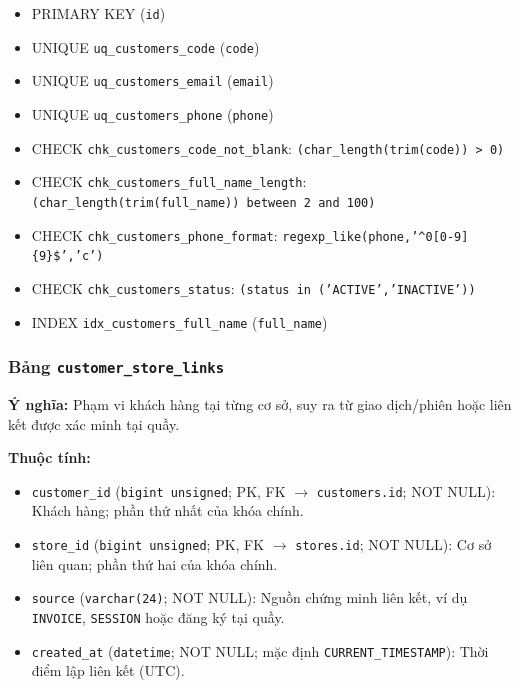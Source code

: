 \begin{itemize}

\item PRIMARY KEY (\texttt{id})

\item UNIQUE \texttt{uq\_customers\_code} (\texttt{code})

\item UNIQUE \texttt{uq\_customers\_email} (\texttt{email})

\item UNIQUE \texttt{uq\_customers\_phone} (\texttt{phone})

\item CHECK \texttt{chk\_customers\_code\_not\_blank}: \texttt{(char\_length(trim(code)) > 0)}

\item CHECK \texttt{chk\_customers\_full\_name\_length}: \texttt{(char\_length(trim(full\_name)) between 2 and 100)}

\item CHECK \texttt{chk\_customers\_phone\_format}: \texttt{regexp\_like(phone,'^0[0-9]\{9\}\$','c')}

\item CHECK \texttt{chk\_customers\_status}: \texttt{(status in ('ACTIVE','INACTIVE'))}

\item INDEX \texttt{idx\_customers\_full\_name} (\texttt{full\_name})

\end{itemize}

\subsubsection{Bảng \texttt{customer\_store\_links}}

\textbf{Ý nghĩa:} Phạm vi khách hàng tại từng cơ sở, suy ra từ giao dịch/phiên hoặc liên kết được xác minh tại quầy.\par

\textbf{Thuộc tính:}

\begin{itemize}

\item \texttt{customer\_id} (\texttt{bigint unsigned}; PK, FK $\rightarrow$ \texttt{customers.id}; NOT NULL): Khách hàng; phần thứ nhất của khóa chính.

\item \texttt{store\_id} (\texttt{bigint unsigned}; PK, FK $\rightarrow$ \texttt{stores.id}; NOT NULL): Cơ sở liên quan; phần thứ hai của khóa chính.

\item \texttt{source} (\texttt{varchar(24)}; NOT NULL): Nguồn chứng minh liên kết, ví dụ \texttt{INVOICE}, \texttt{SESSION} hoặc đăng ký tại quầy.

\item \texttt{created\_at} (\texttt{datetime}; NOT NULL; mặc định \texttt{CURRENT\_TIMESTAMP}): Thời điểm lập liên kết (UTC).

\end{itemize}

